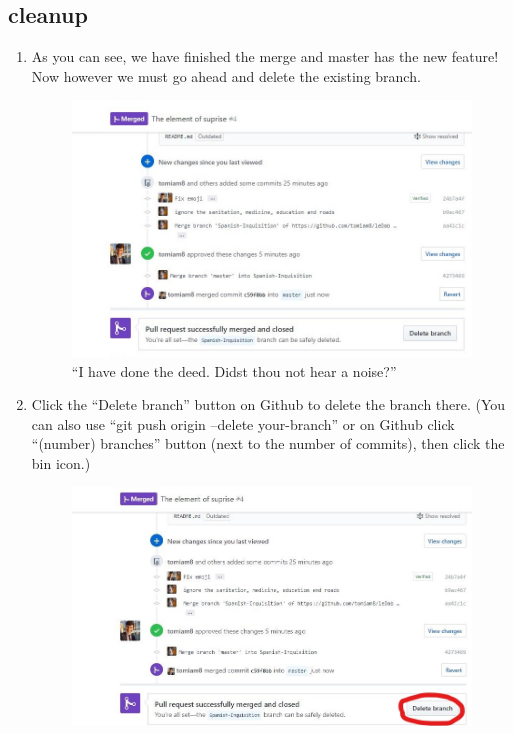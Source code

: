 \documentclass[11pt, titlepage]{article}
\begin{document}
\subsection{cleanup}
\label{BPRW_cleanup}
\begin{enumerate}
	\item As you can see, we have finished the merge and master has the new feature! Now however we must go ahead and delete the existing branch.
	\begin{figure}[H]
		\centering
		\includegraphics[width=\textwidth]{BPRW/10merge-complete}
		\caption{``I have done the deed. Didst thou not hear a noise?''}
	\end{figure}
	\item Click the ``Delete branch'' button on Github to delete the branch there. (You can also use ``git push origin --delete your-branch'' or on Github click ``(number) branches'' button (next to the number of commits), then click the bin icon.)
	\begin{figure}[H]
		\centering
		\includegraphics[width=\textwidth]{BPRW/11delete-branch}

\end{figure}
\end{enumerate}
\end{document}
